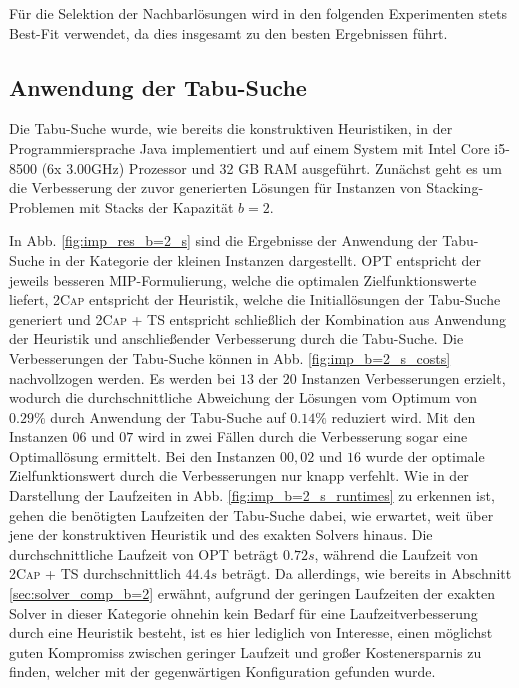 Für die Selektion der Nachbarlösungen wird in den folgenden Experimenten stets Best-Fit verwendet,
da dies insgesamt zu den besten Ergebnissen führt.

\subsection{Anwendung der Tabu-Suche}
\label{sec:tabu_search_experiments}

Die Tabu-Suche wurde, wie bereits die konstruktiven Heuristiken, in der Programmiersprache Java implementiert und
auf einem System mit Intel Core i5-8500 (6x 3.00GHz) Prozessor und 32 GB RAM ausgeführt.
Zunächst geht es um die Verbesserung der zuvor generierten Lösungen für Instanzen von Stacking-Problemen
mit Stacks der Kapazität $b = 2$.

\vfill
\pagebreak

In Abb. \ref{fig:imp_res_b=2_s} sind die Ergebnisse der Anwendung der Tabu-Suche in der Kategorie
der kleinen Instanzen dargestellt. \textsc{OPT} entspricht der jeweils besseren MIP-Formulierung, welche die optimalen Zielfunktionswerte liefert, \textsc{2Cap} entspricht der Heuristik, welche die Initiallösungen der Tabu-Suche generiert und \textsc{2Cap + TS} entspricht schließlich der Kombination aus Anwendung der Heuristik und anschließender Verbesserung durch die Tabu-Suche. Die Verbesserungen der Tabu-Suche können in Abb. \ref{fig:imp_b=2_s_costs} nachvollzogen werden. Es werden bei $13$ der $20$ Instanzen Verbesserungen erzielt, wodurch die durchschnittliche Abweichung der Lösungen vom Optimum von $0.29 \%$ durch Anwendung der Tabu-Suche
auf $0.14 \%$ reduziert wird. Mit den Instanzen $06$ und $07$ wird in zwei Fällen durch die Verbesserung sogar eine Optimallösung ermittelt. Bei den Instanzen $00, 02$ und $16$ wurde der optimale Zielfunktionswert durch die Verbesserungen nur knapp verfehlt. Wie in der Darstellung der Laufzeiten in Abb. \ref{fig:imp_b=2_s_runtimes} zu erkennen ist, gehen die benötigten Laufzeiten der Tabu-Suche dabei, wie erwartet, weit über jene der konstruktiven Heuristik und des exakten Solvers hinaus. Die durchschnittliche Laufzeit von \textsc{OPT} beträgt $0.72s$, während
die Laufzeit von \textsc{2Cap + TS} durchschnittlich $44.4s$ beträgt. Da allerdings, wie bereits in Abschnitt \ref{sec:solver_comp_b=2} erwähnt, aufgrund der geringen Laufzeiten der exakten Solver in dieser Kategorie ohnehin kein Bedarf für eine Laufzeitverbesserung durch eine Heuristik besteht, ist es hier lediglich von Interesse, einen möglichst guten Kompromiss zwischen geringer Laufzeit und großer Kostenersparnis zu finden, welcher mit der gegenwärtigen Konfiguration gefunden wurde.

